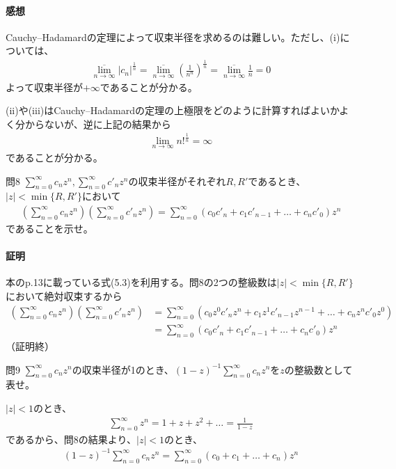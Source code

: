 \paragraph{感想}
Cauchy--Hadamardの定理によって収束半径を求めるのは難しい。ただし、(i)については、
\begin{align*}
    \overline{\lim_{n\to\infty}}|c_n|^\frac{1}{n}=\overline{\lim_{n\to\infty}}\left(\frac{1}{n^n}\right)^\frac{1}{n}=\overline{\lim_{n\to\infty}}\frac{1}{n}=0
\end{align*}
よって収束半径が$+\infty$であることが分かる。

(ii)や(iii)はCauchy--Hadamardの定理の上極限をどのように計算すればよいかよく分からないが、逆に上記の結果から
\begin{align*}
    \lim_{n\to\infty}n!^\frac{1}{n}=\infty
\end{align*}
であることが分かる。

\begin{mysimplebox}{問8}
    $\displaystyle\sum_{n=0}^{\infty}c_nz^n, \sum_{n=0}^{\infty}c'_nz^n$の収束半径がそれぞれ$R, R'$であるとき、$|z|<\min\{R, R'\}$において
    \begin{align*}
        \left(\sum_{n=0}^{\infty}c_nz^n\right)\left(\sum_{n=0}^{\infty}c'_nz^n\right)
        =\sum_{n=0}^{\infty}(c_0c'_n+c_1c'_{n-1}+\dots+c_nc'_0)z^n
    \end{align*}
    であることを示せ。
\end{mysimplebox}
\paragraph{証明}
本のp.13に載っている式(5.3)を利用する。問8の2つの整級数は$|z|<\min\{R, R'\}$において絶対収束するから
\begin{align*}
    \left(\sum_{n=0}^{\infty}c_nz^n\right)\left(\sum_{n=0}^{\infty}c'_nz^n\right)
    &=\sum_{n=0}^{\infty}(c_0z^0c'_nz^n+c_1z^1c'_{n-1}z^{n-1}+\dots+c_nz^nc'_0z^0)\\
    &=\sum_{n=0}^{\infty}(c_0c'_n+c_1c'_{n-1}+\dots+c_nc'_0)z^n
\end{align*}
（証明終）

\begin{mysimplebox}{問9}
    $\displaystyle\sum_{n=0}^{\infty}c_nz^n$の収束半径が1のとき、$\displaystyle(1-z)^{-1}\sum_{n=0}^{\infty}c_nz^n$を$z$の整級数として表せ。
\end{mysimplebox}
$|z|<1$のとき、
\begin{align*}
    \sum_{n=0}^{\infty}z^n=1+z+z^2+\dots=\frac{1}{1-z}
\end{align*}
であるから、問8の結果より、$|z|<1$のとき、
\begin{align*}
    (1-z)^{-1}\sum_{n=0}^{\infty}c_nz^n=\sum_{n=0}^{\infty}(c_0+c_1+\dots+c_n)z^n
\end{align*}

